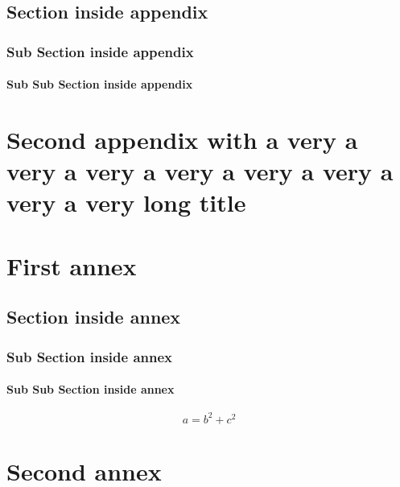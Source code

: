 \documentclass[language=english,debug=true,a4paper,twoside,12pt]{lmc}
\begin{document}
\section{Section inside appendix}
\subsection{Sub Section inside appendix}
\subsubsection{Sub Sub Section inside appendix}
\chapter{Second appendix with a very a very a very a very a very a very a very a very long title}

\lipsum[9]

\annex
\chapter{First annex}
\section{Section inside annex}
\subsection{Sub Section inside annex}
\subsubsection{Sub Sub Section inside annex}
\begin{equation}
    a = b^2 + c^2
\end{equation}
\chapter{Second annex}


\end{document}
